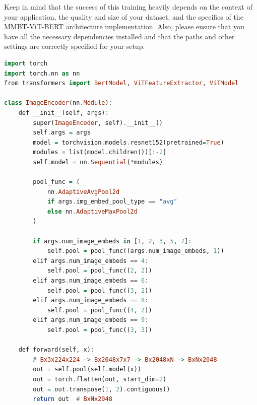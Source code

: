 Keep in mind that the success of this training heavily depends on the context of your application, the quality and size of your dataset, and the specifics of the MMBT-ViT-BERT architecture implementation. Also, please ensure that you have all the necessary dependencies installed and that the paths and other settings are correctly specified for your setup.



\begin{listing}%
\caption{Code snippet illustrating the multimodal architecture}%
\label{lst:listing}%
\begin{lstlisting}[language=Haskell]
import torch
import torch.nn as nn
from transformers import BertModel, ViTFeatureExtractor, ViTModel

class ImageEncoder(nn.Module):
    def __init__(self, args):
        super(ImageEncoder, self).__init__()
        self.args = args
        model = torchvision.models.resnet152(pretrained=True)
        modules = list(model.children())[:-2]
        self.model = nn.Sequential(*modules)

        pool_func = (
            nn.AdaptiveAvgPool2d
            if args.img_embed_pool_type == "avg"
            else nn.AdaptiveMaxPool2d
        )

        if args.num_image_embeds in [1, 2, 3, 5, 7]:
            self.pool = pool_func((args.num_image_embeds, 1))
        elif args.num_image_embeds == 4:
            self.pool = pool_func((2, 2))
        elif args.num_image_embeds == 6:
            self.pool = pool_func((3, 2))
        elif args.num_image_embeds == 8:
            self.pool = pool_func((4, 2))
        elif args.num_image_embeds == 9:
            self.pool = pool_func((3, 3))

    def forward(self, x):
        # Bx3x224x224 -> Bx2048x7x7 -> Bx2048xN -> BxNx2048
        out = self.pool(self.model(x))
        out = torch.flatten(out, start_dim=2)
        out = out.transpose(1, 2).contiguous()
        return out  # BxNx2048

\end{lstlisting}
\end{listing}

